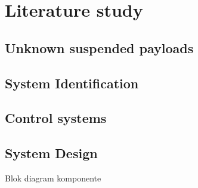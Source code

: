 \graphicspath{{lit_study/fig/}}

\chapter{Literature study}
\label{chap:lit_study}

\section{Unknown suspended payloads}
\section{System Identification}
\section{Control systems}
\section{System Design}
Blok diagram
komponente



